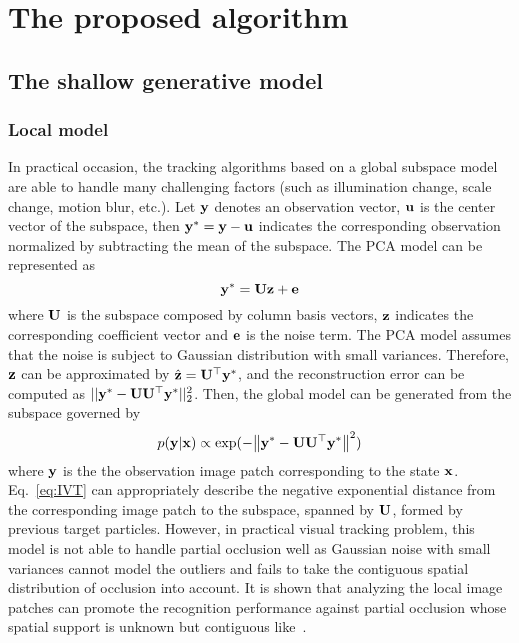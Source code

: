 \documentclass[preprint,12pt,review]{elsarticle}
\begin{document}
\section{The proposed algorithm}
\subsection{The shallow generative model}
\subsubsection{Local model}

In practical occasion, the tracking algorithms based on a global subspace model are able to handle many challenging factors (such as illumination change, scale change, motion blur, etc.).
%
Let $\bf{y}$ denotes an observation vector, $\bf{u}$ is the center vector of the subspace, then ${{\bf{y}}^*} = {\bf{y}} - {\bf{u}}$ indicates the corresponding observation normalized by subtracting the mean of the subspace.
%
The PCA model can be represented as
\begin{equation}{\bf{y}^*} = {\bf{Uz}} + {\bf{e}}
\end{equation}
where $\bf{U}$ is the subspace composed by column basis vectors, $\bf{z}$ indicates the corresponding coefficient vector and $\bf{e}$ is the noise term.
%
The PCA model assumes that the noise is subject to Gaussian distribution with small variances.
%
Therefore, $\bf{z}$ can be approximated by $\hat{\bf{z}}  = {{\bf{U}}^ \top }{{\bf{y}}^*}$, and the reconstruction error can be computed as $||{{\bf{y}}^*} - {\bf{U}}{{\bf{U}}^ \top }{{\bf{y}}^*}||_2^2$.
%
Then, the global model can be generated from the subspace governed by
\begin{equation}
p({{\bf{y}}}|{{\bf{x}}}) \propto \exp ( - {\left\| {{{\bf{y}}^*} - {\bf{U}}{{\bf{U}}^ \top }{{\bf{y}}^*}} \right\|^2})
\label{eq:IVT}
\end{equation}
where ${{\bf{y}}}$ is the the observation image patch corresponding to the state ${{\bf{x}}}$.
%
Eq.~\ref{eq:IVT} can appropriately describe the negative exponential distance from the corresponding image patch to the subspace, spanned by $\bf{U}$, formed by previous target particles.
%
However, in practical visual tracking problem, this model is not able to handle partial occlusion well as Gaussian noise with small variances cannot model the outliers and fails to take the contiguous spatial distribution of occlusion into account.
%
It is shown that analyzing the local image patches can promote the recognition performance against partial occlusion whose spatial support is unknown but contiguous like~\cite{martinez2002recognizing, ahonen2006face}.
\end{document}
